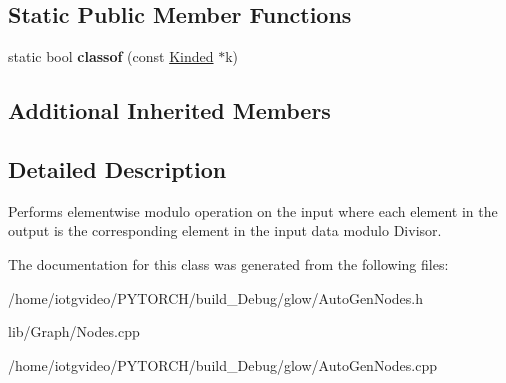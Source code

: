 \subsection*{Static Public Member Functions}
\begin{DoxyCompactItemize}
\item 
\mbox{\label{classglow_1_1_modulo_node_a9938c66632d71dacd3bdd3d5c76455ac}} 
static bool {\bfseries classof} (const \hyperlink{classglow_1_1_kinded}{Kinded} $\ast$k)
\end{DoxyCompactItemize}
\subsection*{Additional Inherited Members}


\subsection{Detailed Description}
Performs elementwise modulo operation on the input where each element in the output is the corresponding element in the input data modulo Divisor. 

The documentation for this class was generated from the following files\+:\begin{DoxyCompactItemize}
\item 
/home/iotgvideo/\+P\+Y\+T\+O\+R\+C\+H/build\+\_\+\+Debug/glow/Auto\+Gen\+Nodes.\+h\item 
lib/\+Graph/Nodes.\+cpp\item 
/home/iotgvideo/\+P\+Y\+T\+O\+R\+C\+H/build\+\_\+\+Debug/glow/Auto\+Gen\+Nodes.\+cpp\end{DoxyCompactItemize}
